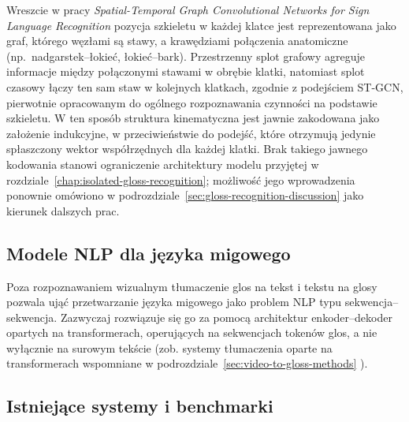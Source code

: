 Wreszcie w pracy \emph{Spatial-Temporal Graph Convolutional Networks for Sign Language
Recognition} \cite{correia2019stgcn} pozycja szkieletu w każdej klatce jest
reprezentowana jako graf, którego węzłami są stawy, a krawędziami połączenia
anatomiczne (np.\ nadgarstek--łokieć, łokieć--bark). Przestrzenny splot grafowy
agreguje informacje między połączonymi stawami w obrębie klatki, natomiast splot
czasowy łączy ten sam staw w kolejnych klatkach, zgodnie z podejściem ST-GCN,
pierwotnie opracowanym do ogólnego rozpoznawania czynności na podstawie szkieletu.
W ten sposób struktura kinematyczna jest jawnie zakodowana jako założenie
indukcyjne, w przeciwieństwie do podejść, które otrzymują jedynie spłaszczony
wektor współrzędnych dla każdej klatki. Brak takiego jawnego kodowania stanowi
ograniczenie architektury modelu przyjętej
w rozdziale~\ref{chap:isolated-gloss-recognition}; możliwość jego wprowadzenia
ponownie omówiono w podrozdziale~\ref{sec:gloss-recognition-discussion} jako
kierunek dalszych prac.

\subsection{Modele NLP dla języka migowego}
\label{sec:nlp-models-sign-language}

Poza rozpoznawaniem wizualnym tłumaczenie glos na tekst i tekstu na glosy pozwala
ująć przetwarzanie języka migowego jako problem NLP typu sekwencja--sekwencja.
Zazwyczaj rozwiązuje się go za pomocą architektur enkoder--dekoder opartych
na transformerach, operujących na sekwencjach tokenów glos, a nie wyłącznie
na surowym tekście (zob. systemy tłumaczenia oparte na transformerach wspomniane
w podrozdziale~\ref{sec:video-to-gloss-methods}
\cite{review2024dlprocessing}).


\subsection{Istniejące systemy i benchmarki}
\label{sec:existing-systems-benchmarks}


